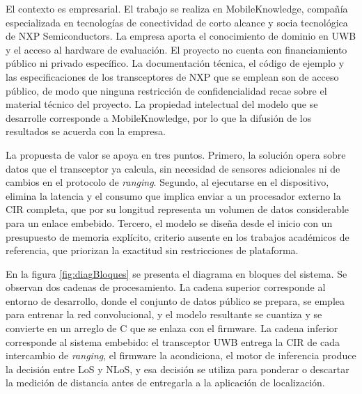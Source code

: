 \documentclass[
11pt, %
]{charter}
\begin{document}
El contexto es empresarial. El trabajo se realiza en MobileKnowledge, compañía especializada en tecnologías de conectividad de corto alcance y socia tecnológica de NXP Semiconductors. La empresa aporta el conocimiento de dominio en UWB y el acceso al hardware de evaluación. El proyecto no cuenta con financiamiento público ni privado específico. La documentación técnica, el código de ejemplo y las especificaciones de los transceptores de NXP que se emplean son de acceso público, de modo que ninguna restricción de confidencialidad recae sobre el material técnico del proyecto. La propiedad intelectual del modelo que se desarrolle corresponde a MobileKnowledge, por lo que la difusión de los resultados se acuerda con la empresa.

La propuesta de valor se apoya en tres puntos. Primero, la solución opera sobre datos que el transceptor ya calcula, sin necesidad de sensores adicionales ni de cambios en el protocolo de \textit{ranging}. Segundo, al ejecutarse en el dispositivo, elimina la latencia y el consumo que implica enviar a un procesador externo la CIR completa, que por su longitud representa un volumen de datos considerable para un enlace embebido. Tercero, el modelo se diseña desde el inicio con un presupuesto de memoria explícito, criterio ausente en los trabajos académicos de referencia, que priorizan la exactitud sin restricciones de plataforma.

En la figura \ref{fig:diagBloques} se presenta el diagrama en bloques del sistema. Se observan dos cadenas de procesamiento. La cadena superior corresponde al entorno de desarrollo, donde el conjunto de datos público se prepara, se emplea para entrenar la red convolucional, y el modelo resultante se cuantiza y se convierte en un arreglo de C que se enlaza con el firmware. La cadena inferior corresponde al sistema embebido: el transceptor UWB entrega la CIR de cada intercambio de \textit{ranging}, el firmware la acondiciona, el motor de inferencia produce la decisión entre LoS y NLoS, y esa decisión se utiliza para ponderar o descartar la medición de distancia antes de entregarla a la aplicación de localización.
\end{document}
